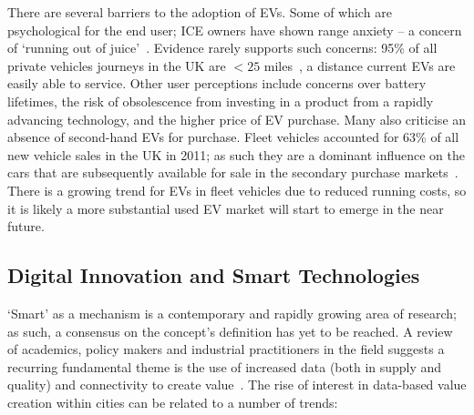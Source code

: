\documentclass[b5paper,10pt]{article}
\begin{document}
There are several barriers to the adoption of EVs. Some of which are
psychological for the end user; ICE owners have shown range anxiety --
a concern of `running out of
juice'~\citep{oflev:2011,yilmaz+krein:2012}. Evidence rarely supports
such concerns: 95\% of all private vehicles journeys in the UK are
$<25$ miles~\citep{oflev:2011}, a distance current EVs are easily able
to service. Other user perceptions include concerns over battery
lifetimes, the risk of obsolescence from investing in a product from a
rapidly advancing technology, and the higher price of EV purchase.
Many also criticise an absence of second-hand EVs for purchase. Fleet
vehicles accounted for 63\% of all new vehicle sales in the UK in
2011; as such they are a dominant influence on the cars that are
subsequently available for sale in the secondary purchase
markets~\citep{fleets:2012}. There is a growing trend for EVs in fleet
vehicles due to reduced running costs, so it is likely a more
substantial used EV market will start to emerge in the near future.


\subsection{Digital Innovation and Smart Technologies}

`Smart' as a mechanism is a contemporary and rapidly growing area of
research; as such, a consensus on the concept's definition has yet to
be reached. A review of academics, policy makers and industrial
practitioners in the field suggests a recurring fundamental theme is
the use of increased data (both in supply and quality) and
connectivity to create
value~\citep{komninos:2002,arup-et-al:2011,harrison+abbottdonnelly:2011,batty-et-al:2012,buscher:2014}. The
rise of interest in data-based value creation within cities can be
related to a number of trends:
\end{document}
